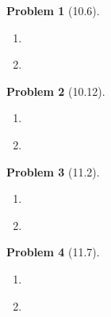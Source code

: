 \documentclass[12pt]{article}
\theoremstyle{definition}
\newtheorem{problem}{Problem}
\begin{document}
\begin{problem}[10.6]
    \begin{enumerate}[label=(\alph*)]
        \item 
        \begin{solution}

        \end{solution}

        \item 
        \begin{solution}

        \end{solution}
    \end{enumerate}
\end{problem}

\begin{problem}[10.12]
    \begin{enumerate}[label=(\alph*)]
        \item 
        \begin{solution}

        \end{solution}

        \item 
        \begin{solution}

        \end{solution}
    \end{enumerate}
\end{problem}

\begin{problem}[11.2]
    \begin{enumerate}[label=(\alph*)]
        \item 
        \begin{solution}

        \end{solution}

        \item 
        \begin{solution}

        \end{solution}
    \end{enumerate}
\end{problem}

\begin{problem}[11.7]
    \begin{enumerate}[label=(\alph*)]
        \item 
        \begin{solution}

        \end{solution}

        \item 
        \begin{solution}

        \end{solution}
    \end{enumerate}
\end{problem}
\end{document}
